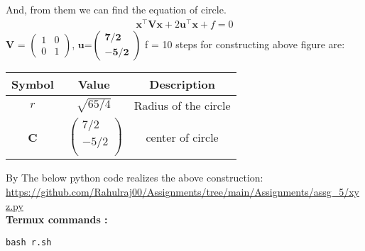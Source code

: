 \documentclass[10pt, a4paper]{article}
\let\vec\mathbf
\begin{document}
And, from them we can find the equation of circle.\\
 \begin{align}
\vec{x}^{\top}\vec{V}\vec{x}+2\vec{u}^{\top}\vec{x}+f=0
\end{align}	
$\vec{V}$ = $\begin{pmatrix}
 1 & 0\\
 0 & 1
 \end{pmatrix}$, 
  $\vec{u}$=$\vec{\begin{pmatrix}7/2 \\-5/2 \end{pmatrix}}$
  f = 10
steps for constructing above figure are:  
\begin{center}
\begin{tabular}{|c|c|c|}
	\hline
	\textbf{Symbol}&\textbf{Value}&\textbf{Description}\\
	\hline
	$r$&$\sqrt{65/4}$&Radius of the circle\\
	\hline
	\textbf{C}&$\
	\begin{pmatrix}
		7/2 \\
		-5/2 \\
	\end{pmatrix}$
	&center of circle\\
	\hline
\end{tabular}
\end{center}
\vspace{1mm}
By 
The below python code realizes the above construction:	\\
\url{https://github.com/Rahulraj00/Assignments/tree/main/Assignments/assg_5/xyz.py}\\
\textbf{Termux commands :}
\begin{lstlisting}
bash r.sh
\end{lstlisting}

\end{document}
